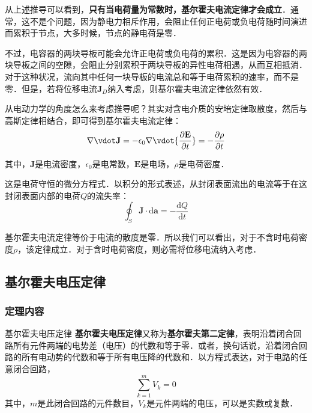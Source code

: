 从上述推导可以看到，\textbf{只有当电荷量为常数时，基尔霍夫电流定律才会成立}．通常，这不是个问题，因为静电力相斥作用，会阻止任何正电荷或负电荷随时间演进而累积于节点，大多时候，节点的静电荷是零．

不过，电容器的两块导板可能会允许正电荷或负电荷的累积．这是因为电容器的两块导板之间的空隙，会阻止分别累积于两块导板的异性电荷相遇，从而互相抵消．对于这种状况，流向其中任何一块导板的电流总和等于电荷累积的速率，而不是零．但是，若将位移电流$\mathbf{J}_D$纳入考虑，则基尔霍夫电流定律依然有效．

从电动力学的角度怎么来考虑推导呢？其实对含电介质的安培定律取散度，然后与高斯定律相结合，即可得到基尔霍夫电流定律：
\begin{equation}
\nabla \vdot \mathbf {J} =-\epsilon _{0}\nabla \vdot {\frac {\partial \mathbf {E} }{\partial t}}=-{\frac {\partial \rho }{\partial t}}
\end{equation}

其中，$\mathbf{J}$是电流密度，$\epsilon_0$是电常数，$\mathbf{E}$是电场，$\rho$是电荷密度．

这是电荷守恒的微分方程式．以积分的形式表述，从封闭表面流出的电流等于在这封闭表面内部的电荷$Q$的流失率：
\begin{equation}
\oint _{S}\mathbf {J} \cdot \mathrm {d} \mathbf {a} =-{\frac {\mathrm {d} Q}{\mathrm {d} t}}
\end{equation}

基尔霍夫电流定律等价于电流的散度是零．所以我们可以看出，对于不含时电荷密度$\rho$，该定律成立．对于含时电荷密度，则必需将位移电流纳入考虑．

\subsection{基尔霍夫电压定律}
\subsubsection{定理内容}
\begin{theorem}{基尔霍夫电压定律}
\textbf{基尔霍夫电压定律}又称为\textbf{基尔霍夫第二定律}，表明沿着闭合回路所有元件两端的电势差（电压）的代数和等于零．或者，换句话说，沿着闭合回路的所有电动势的代数和等于所有电压降的代数和．以方程式表达，对于电路的任意闭合回路，
\begin{equation}
\sum_{k=1}^m V_k = 0
\end{equation}
其中，$m$是此闭合回路的元件数目，$V_k$是元件两端的电压，可以是实数或复数．
\end{theorem}

